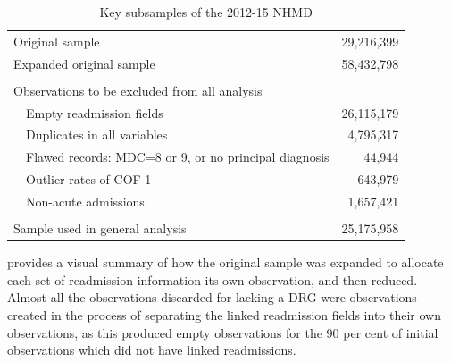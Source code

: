 \documentclass[submission]{grattan}
\begin{document}
\begin{table}
\caption{Key subsamples of the 2012-15 NHMD}\label{tbl:key-subsamples}
\begin{tabularx}{\linewidth}{p{0.5em}Xr}
\toprule
\multicolumn{2}{l}{Original sample}                               & 29,216,399\tabularnewline
\multicolumn{2}{l}{Expanded original sample}                      & 58,432,798\tabularnewline
                                                                 & & \tabularnewline
\multicolumn{2}{l}{Observations to be excluded from all analysis} & \tabularnewline
& Empty readmission fields                                          & 26,115,179\tabularnewline
& Duplicates in all variables                                       & 4,795,317\tabularnewline
& Flawed records: MDC=8 or 9, or no principal diagnosis             & 44,944\tabularnewline
& Outlier rates of COF 1                                            & 643,979\tabularnewline
& Non-acute admissions                                              & 1,657,421\tabularnewline
                                                                  & & \tabularnewline
\multicolumn{2}{l}{Sample used in general analysis}               & 25,175,958\tabularnewline
\bottomrule
\end{tabularx}
\end{table}

 provides a visual summary of how the original sample was expanded to allocate each set of readmission information its own observation, and then reduced.
Almost all the observations discarded for lacking a DRG were observations created in the process of separating the linked readmission fields into their own observations, as this produced empty observations for the 90 per cent of initial observations which did not have linked readmissions.
\end{document}
